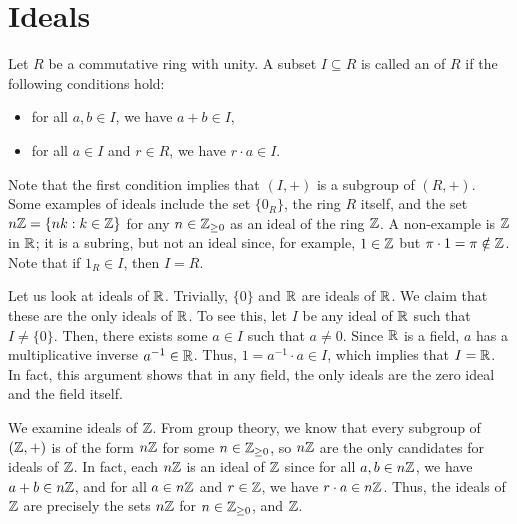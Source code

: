 \section{Ideals}

\begin{definition}
    Let $R$ be a commutative ring with unity. A subset $I \subseteq R$ is called an  of $R$ if the following conditions hold:
    \begin{itemize}
        \item for all $a, b \in I$, we have $a + b \in I$,
        \item for all $a \in I$ and $r \in R$, we have $r \cdot a \in I$.
    \end{itemize}
\end{definition}

Note that the first condition implies that $(I, +)$ is a subgroup of $(R, +)$. Some examples of ideals include the set $\{0_{R}\}$, the ring $R$ itself, and the set $n\mathbb{Z} = \{nk : k \in \mathbb{Z}\}$ for any $n \in \mathbb{Z}_{\geq 0}$ as an ideal of the ring $\mathbb{Z}$. A non-example is $\mathbb{Z}$ in $\mathbb{R}$; it is a subring, but not an ideal since, for example, $1 \in \mathbb{Z}$ but $\pi \cdot 1 = \pi \notin \mathbb{Z}$. Note that if $1_{R} \in I$, then $I = R$.

\begin{example}
    Let us look at ideals of $\mathbb{R}$. Trivially, $\{0\}$ and $\mathbb{R}$ are ideals of $\mathbb{R}$. We claim that these are the only ideals of $\mathbb{R}$. To see this, let $I$ be any ideal of $\mathbb{R}$ such that $I \neq \{0\}$. Then, there exists some $a \in I$ such that $a \neq 0$. Since $\mathbb{R}$ is a field, $a$ has a multiplicative inverse $a^{-1} \in \mathbb{R}$. Thus, $1 = a^{-1} \cdot a \in I$, which implies that $I = \mathbb{R}$. In fact, this argument shows that in any field, the only ideals are the zero ideal and the field itself.
\end{example}

\begin{example}
    We examine ideals of $\mathbb{Z}$. From group theory, we know that every subgroup of $(\mathbb{Z}, +)$ is of the form $n\mathbb{Z}$ for some $n \in \mathbb{Z}_{\geq 0}$, so $n\mathbb{Z}$ are the only candidates for ideals of $\mathbb{Z}$. In fact, each $n\mathbb{Z}$ is an ideal of $\mathbb{Z}$ since for all $a, b \in n\mathbb{Z}$, we have $a + b \in n\mathbb{Z}$, and for all $a \in n\mathbb{Z}$ and $r \in \mathbb{Z}$, we have $r \cdot a \in n\mathbb{Z}$. Thus, the ideals of $\mathbb{Z}$ are precisely the sets $n\mathbb{Z}$ for $n \in \mathbb{Z}_{\geq 0}$, and $\mathbb{Z}$.
\end{example}

